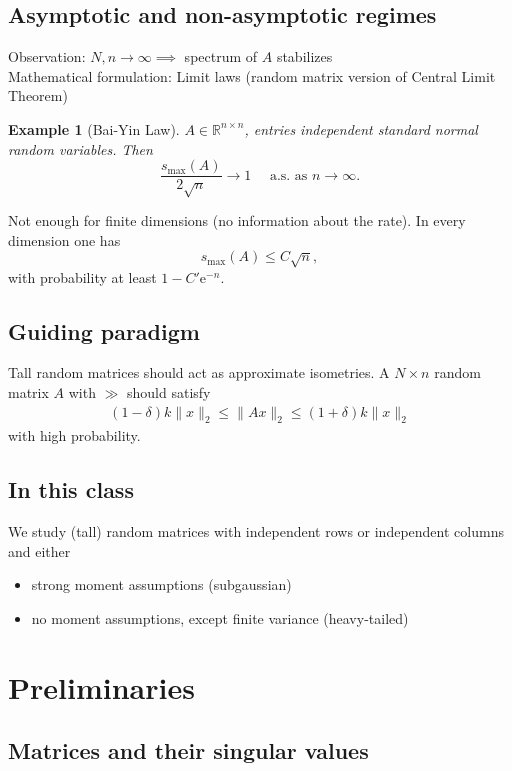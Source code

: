 \documentclass[13pt]{article}
\theoremstyle{plain}
\newtheorem*{ex}{Example}
\newcommand{\R}{\mathbb{R}}
\newcommand{\e}{\mathrm{e}}
\begin{document}
\subsection{Asymptotic and non-asymptotic regimes}

Observation: $N, n \to \infty \implies $ spectrum of $A$ stabilizes \\
Mathematical formulation: Limit laws (random matrix version of Central Limit Theorem)

\begin{ex}[Bai-Yin Law]
    $A \in \R^{n \times n}$, entries independent standard normal random variables.
    Then
    \[
        \frac{s_{\max}(A)}{2\sqrt{n}} \to 1 \quad \text{ a.s. as } n \to \infty.
    \]
\end{ex}

Not enough for finite dimensions (no information about the rate). In every dimension one has
\[
    s_{\max}(A) \le C\sqrt{n},
\]
with probability at least $1 - C'\e^{-n}$.

\subsection{Guiding paradigm}

Tall random matrices should act as approximate isometries.
A $N \times n$ random matrix $A$ with $\gg$ should satisfy
\[
    \begin{aligned}
        (1-\delta)k\|x\|_2 \le \|Ax\|_2 \le (1+\delta)k\|x\|_2
    \end{aligned}
\]
with high probability.

\subsection{In this class}

We study (tall) random matrices with independent rows or independent columns
and either
\begin{itemize}
    \item strong moment assumptions (subgaussian)
    \item no moment assumptions, except finite variance (heavy-tailed)
\end{itemize}

\section{Preliminaries}

\subsection{Matrices and their singular values}
\end{document}
